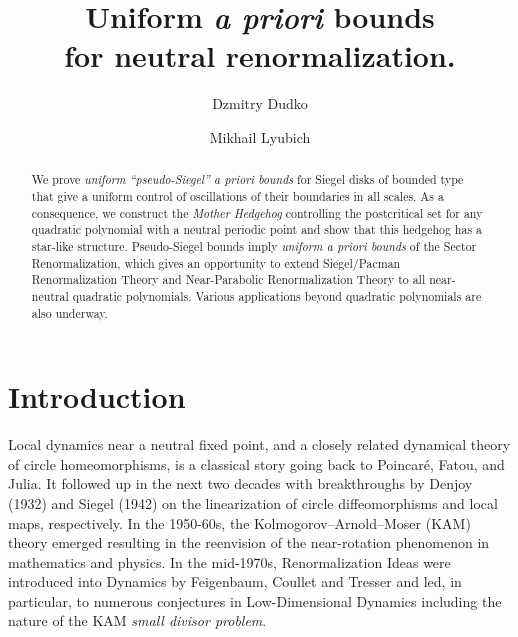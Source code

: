 \documentclass{amsart}
\newcommand{\1}{{\mathbb 1 }}
\newcommand{\reminder}[1]{\textsl{$\lhd\rhd$#1$\lhd\rhd$}\marginpar{$\lhd\rhd\lhd\rhd\lhd\rhd$}}
\theoremstyle{remark}
\numberwithin{equation}{section}
\theoremstyle{definition}
\begin{document}
\title[Uniform \emph{a priori} bounds for neutral renormalization]{Uniform \emph{a priori} bounds  \\ for neutral renormalization.}
\author{Dzmitry Dudko}
\author{Mikhail Lyubich}


\begin{abstract} We prove {\em uniform ``pseudo-Siegel'' a priori bounds} for Siegel disks of bounded type that give a  uniform control of oscillations of their boundaries in all scales. As a consequence, we construct the {\em Mother Hedgehog} controlling the postcritical set for any quadratic polynomial with a neutral periodic point and show that this hedgehog has a star-like structure. Pseudo-Siegel bounds imply \emph{uniform a priori bounds} of the Sector Renormalization, which gives an opportunity to extend Siegel/Pacman Renormalization Theory and Near-Parabolic Renormalization Theory to all near-neutral quadratic polynomials. Various applications beyond quadratic polynomials are also underway.
\end{abstract}
\maketitle


\setcounter{tocdepth}{1}






\tableofcontents



\section{Introduction}



Local dynamics near a neutral fixed point, and a closely related dynamical theory of circle homeomorphisms,
is a classical story going back to Poincar\'e, Fatou,  and Julia.
It followed up in the next two decades  with breakthroughs by Denjoy (1932)
and  Siegel (1942) on the linearization of circle diffeomorphisms and local maps, respectively. In the 1950-60s, the Kolmogorov–Arnold–Moser (KAM) theory emerged resulting in the reenvision of the near-rotation phenomenon in mathematics and physics. In the mid-1970s, Renormalization Ideas were introduced into Dynamics by  Feigenbaum, Coullet and Tresser and led, in particular, to numerous conjectures in Low-Dimensional Dynamics including the nature of the KAM \emph{small divisor problem}.
\end{document}
